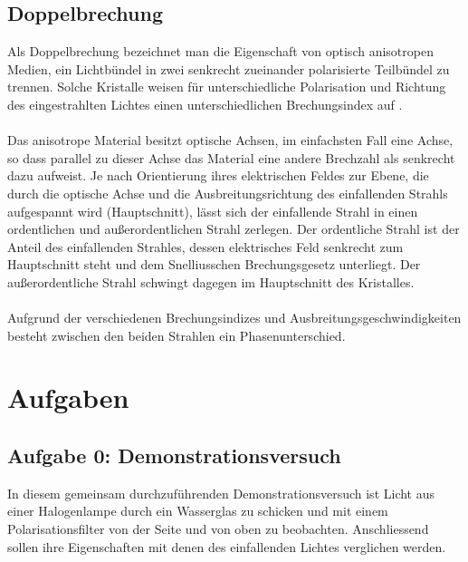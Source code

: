 \documentclass[a4paper,titlepage]{scrartcl}
\numberwithin{equation}{section}
\begin{document}
\subsection{Doppelbrechung}
Als Doppelbrechung bezeichnet man die Eigenschaft von optisch anisotropen Medien, ein Lichtbündel in zwei senkrecht zueinander polarisierte Teilbündel zu trennen. Solche Kristalle weisen für unterschiedliche Polarisation und Richtung des eingestrahlten Lichtes einen unterschiedlichen Brechungsindex auf \cite{wiki:doppelbrechung}.\\ \\
Das anisotrope Material besitzt optische Achsen, im einfachsten Fall eine Achse, so dass parallel zu dieser Achse das Material eine andere Brechzahl als senkrecht dazu aufweist. Je nach Orientierung ihres elektrischen Feldes zur Ebene, die durch die optische Achse und die Ausbreitungsrichtung des einfallenden Strahls aufgespannt wird (Hauptschnitt), lässt sich der einfallende Strahl in einen ordentlichen und außerordentlichen Strahl zerlegen. Der ordentliche Strahl ist der Anteil des einfallenden Strahles, dessen elektrisches Feld senkrecht zum Hauptschnitt steht und dem Snelliusschen Brechungsgesetz unterliegt. Der außerordentliche Strahl schwingt dagegen im Hauptschnitt des Kristalles.\\ \\
Aufgrund der verschiedenen Brechungsindizes und Ausbreitungsgeschwindigkeiten besteht zwischen den beiden Strahlen ein Phasenunterschied.

\section{Aufgaben}
\subsection{Aufgabe 0: Demonstrationsversuch}
In diesem gemeinsam durchzuführenden Demonstrationsversuch ist Licht aus einer Halogenlampe durch ein Wasserglas zu schicken und mit einem Polarisationsfilter von der Seite und von oben zu beobachten. Anschliessend sollen ihre Eigenschaften mit denen des einfallenden Lichtes verglichen werden.
\end{document}
